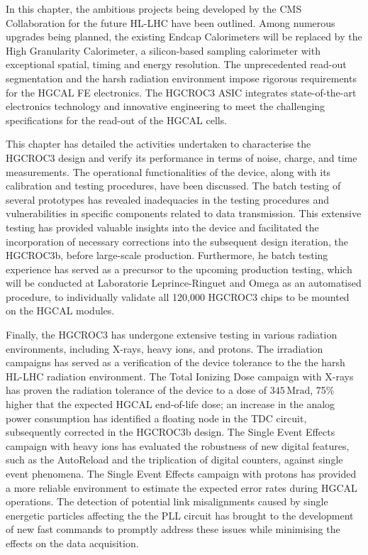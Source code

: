 In this chapter, the ambitious projects being developed by the CMS Collaboration for the future HL-LHC have been outlined. Among numerous upgrades being planned, the existing Endcap Calorimeters will be replaced by the High Granularity Calorimeter, a silicon-based sampling calorimeter with exceptional spatial, timing and energy resolution. The unprecedented read-out segmentation and the harsh radiation environment impose rigorous requirements for the HGCAL FE electronics. The HGCROC3 ASIC integrates state-of-the-art electronics technology and innovative engineering to meet the challenging specifications for the read-out of the HGCAL cells. 

This chapter has detailed the activities undertaken to characterise the HGCROC3 design and verify its performance in terms of noise, charge, and time measurements. The operational functionalities of the device, along with its calibration and testing procedures, have been discussed. The batch testing of several prototypes has revealed inadequacies in the testing procedures and vulnerabilities in specific components related to data transmission.
This extensive testing has provided valuable insights into the device and facilitated the incorporation of necessary corrections into the subsequent design iteration, the HGCROC3b, before large-scale production.
Furthermore, he batch testing experience has served as a precursor to the upcoming production testing, which will be conducted at Laboratorie Leprince-Ringuet and Omega as an automatised procedure, to individually validate all 120,000 HGCROC3 chips to be mounted on the HGCAL modules.

Finally, the HGCROC3 has undergone extensive testing in various radiation environments, including X-rays, heavy ions, and protons. The irradiation campaigns has served as a verification of the device tolerance to the the harsh HL-LHC radiation environment. The Total Ionizing Dose campaign with X-rays has proven the radiation tolerance of the device to a dose of $345\,\textrm{Mrad}$, 75\% higher that the expected HGCAL end-of-life dose; an increase in the analog power consumption has identified a floating node in the TDC circuit, subsequently corrected in the HGCROC3b design. The Single Event Effects campaign with heavy ions has evaluated the robustness of new digital features, such as the AutoReload and the triplication of digital counters, against single event phenomena. The Single Event Effects campaign with protons has provided a more reliable environment to estimate the expected error rates during HGCAL operations. The detection of potential link misalignments caused by single energetic particles affecting the the PLL circuit has brought to the development of new fast commands to promptly address these issues while minimising the effects on the data acquisition.

